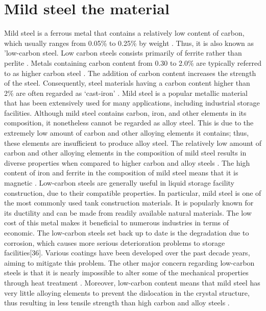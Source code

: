 \documentclass[12pt]{report}
\begin{document}
\section{Mild steel the material}
Mild steel is a ferrous metal that contains a relatively low content of carbon, which usually ranges from 0.05\% to 0.25\% by weight \cite{callister2018materials}. Thus, it is also known as 'low-carbon steel.  Low carbon steels consists primarily of ferrite rather than perlite \cite{li2018effect}. Metals containing carbon content from 0.30 to 2.0\% are typically referred to as higher carbon steel \cite{timings2008fabrication}. The addition of carbon content increases the strength of the steel. Consequently, steel materials having a carbon content higher than 2\% are often regarded as ‘cast-iron' \cite{callister2018materials}.  Mild steel is a popular metallic material that has been extensively used for many applications, including industrial storage facilities.
Although mild steel contains carbon, iron, and other elements in its composition, it nonetheless cannot be regarded as alloy steel. This is due to the extremely low amount of carbon and other alloying elements it contains; thus, these elements are insufficient to produce alloy steel. The relatively low amount of carbon and other alloying elements in the composition of mild steel results in diverse properties when compared to higher carbon and alloy steels \cite{timings2008fabrication}. The high content of iron and ferrite in the composition of mild steel means that it is magnetic \cite{li2018effect}.
Low-carbon steels are generally useful in liquid storage facility construction, due to their compatible properties. In particular, mild steel is one of the most commonly used tank construction materials. It is popularly known for its ductility and can be made from readily available natural materials. The low cost of this metal makes it beneficial to numerous industries in terms of economic.
The low-carbon steels set back up to date is the degradation due to corrosion, which causes more serious deterioration problems to storage facilities[36]. Various coatings have been developed over the past decade years, aiming to mitigate this problem. The other major concern regarding low-carbon steels is that it is nearly impossible to alter some of the mechanical properties through heat treatment \cite{callister2018materials}. Moreover, low-carbon content means that mild steel has very little alloying elements to prevent the dislocation in the crystal structure, thus resulting in less tensile strength than high carbon and alloy steels \cite{callister2018materials}.
\end{document}
